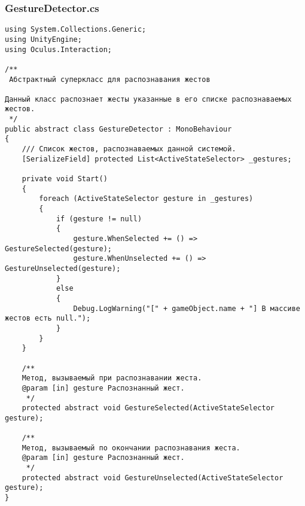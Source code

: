 \subsubsection*{GestureDetector.cs}
\begin{verbatim}
﻿using System.Collections.Generic;
using UnityEngine;
using Oculus.Interaction;

/**
 Абстрактный суперкласс для распознавания жестов

Данный класс распознает жесты указанные в его списке распознаваемых жестов.
 */
public abstract class GestureDetector : MonoBehaviour
{
    /// Список жестов, распознаваемых данной системой.
    [SerializeField] protected List<ActiveStateSelector> _gestures;

    private void Start()
    {
        foreach (ActiveStateSelector gesture in _gestures)
        {
            if (gesture != null)
            {
                gesture.WhenSelected += () => GestureSelected(gesture);
                gesture.WhenUnselected += () => GestureUnselected(gesture);
            }
            else
            {
                Debug.LogWarning("[" + gameObject.name + "] В массиве жестов есть null.");
            }
        }
    }

    /**
    Метод, вызываемый при распознавании жеста.
    @param [in] gesture Распознанный жест.
     */
    protected abstract void GestureSelected(ActiveStateSelector gesture);

    /**
    Метод, вызываемый по окончании распознавания жеста.
    @param [in] gesture Распознанный жест.
     */
    protected abstract void GestureUnselected(ActiveStateSelector gesture);
}

\end{verbatim}
